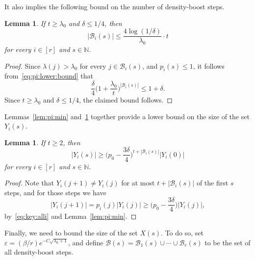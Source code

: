 \documentclass[12pt,reqno]{amsart}
\newtheorem{lemma}[theorem]{Lemma}
\theoremstyle{definition}
\theoremstyle{remark}
\newcommand\N{\mathbb{N}}
\newcommand\cB{\mathcal{B}}
\newcommand\eps{\varepsilon}
\renewcommand{\le}{\leqslant}
\renewcommand{\ge}{\geqslant}
\def\eps{\varepsilon}
\def\N{\mathbb{N}}
\def\cB{\mathcal{B}}
\begin{document}
It also implies the following bound on the number of density-boost steps.

%
\begin{lemma}
	\label{lem:Bi:max}
	If\/ \(t \ge \lambda_0\) and\/ \(\delta \le 1/4\), then
	\begin{equation*}
		|\cB_i(s)| \le \frac{4 \log(1/\delta)}{\lambda_0} \cdot t
	\end{equation*}
	for every \(i \in [r]\) and \(s \in \N\).
\end{lemma}
%
\begin{proof}
	Since \(\lambda(j) > \lambda_0\) for every \(j \in \cB_i(s)\), and \(p_i(s) \le 1\), it follows from~\eqref{eq:pi:lower:bound} that
	\begin{equation*}
		\frac{\delta}{4} \bigg( 1 + \frac{\lambda_0}{t} \bigg)^{|\cB_i(s)|} \le 1 + \delta.
	\end{equation*}
	Since \(t \ge \lambda_0\) and \(\delta \le 1/4\), the claimed bound follows.
\end{proof}
%

Lemmas~\ref{lem:pi:min} and~\ref{lem:Bi:max} together provide a lower bound on the size of the set \(Y_i(s)\).

%
\begin{lemma}
	\label{lem:Y:lower:bound}
	If\/ \(t \ge 2\), then
	\begin{equation*}
		|Y_i(s)| \ge \bigg( p_0 - \frac{3\delta}{4} \bigg)^{t + |\cB_i(s)|} |Y_i(0)|
	\end{equation*}
	for every \(i \in [r]\) and \(s \in \N\).
\end{lemma}
%
\begin{proof}
	Note that \(Y_i(j+1) \ne Y_i(j)\) for at most \(t + |\cB_i(s)|\) of the first \(s\) steps, and for those steps we have
	\begin{equation*}
		|Y_i(j+1)| = p_i(j) |Y_i(j)| \ge \bigg( p_0 - \frac{3\delta}{4} \bigg) |Y_i(j)|,
	\end{equation*}
	by~\eqref{eq:key:alli} and Lemma~\ref{lem:pi:min}.
\end{proof}
%

Finally, we need to bound the size of the set \(X(s)\). To do so, set \(\eps = (\beta / r) e^{- C \sqrt{\lambda_0 + 1}}\), and define \(\cB(s) = \cB_1(s) \cup \cdots \cup \cB_r(s)\) to be the set of all density-boost steps.
\end{document}
